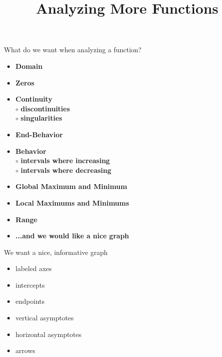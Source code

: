 \documentclass{ximera}
\title{Analyzing More Functions}
\begin{document}
\begin{abstract}
%
\end{abstract}
\maketitle











What do we want when analyzing a function?


\begin{itemize}
     \item \textbf{\textcolor{red!70!black}{Domain}} 
     \item \textbf{\textcolor{red!70!black}{Zeros}} 
     \item \textbf{\textcolor{red!70!black}{Continuity}} \\
     \text{    }$\circ$ \textbf{\textcolor{purple!85!blue}{discontinuities}}\\
     \text{    }$\circ$ \textbf{\textcolor{purple!85!blue}{singularities}}\\
     \item \textbf{\textcolor{red!70!black}{End-Behavior}} 
     \item \textbf{\textcolor{red!70!black}{Behavior}} \\
     \text{    }$\circ$ \textbf{\textcolor{purple!85!blue}{intervals where increasing}}\\
     \text{    }$\circ$ \textbf{\textcolor{purple!85!blue}{intervals where decreasing}}\\
     \item \textbf{\textcolor{red!70!black}{Global Maximum and Minimum}} 
     \item \textbf{\textcolor{red!70!black}{Local Maximums and Minimums}} 
     \item \textbf{\textcolor{red!70!black}{Range}} 
     \item \textbf{\textcolor{blue!55!black}{...and we would like a nice graph}} 
\end{itemize}




We want a nice, informative graph
\begin{itemize}
	\item labeled axes
	\item intercepts
	\item endpoints
	\item vertical asymptotes
	\item horizontal asymptotes
	\item arrows
\end{itemize}
\end{document}
